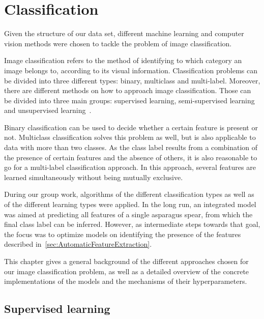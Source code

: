 %
\section{Classification}
\label{ch:Classification}

Given the structure of our data set, different machine learning and computer vision methods were chosen to tackle the problem of image classification.

\bigskip
Image classification refers to the method of identifying to which category an image belongs to, according to its visual information. Classification problems can be divided into three different types: binary, multiclass and multi-label. Moreover, there are different methods on how to approach image classification. Those can be divided into three main groups: supervised learning, semi-supervised learning and unsupervised learning~\citep{har2003constraint}.

Binary classification can be used to decide whether a certain feature is present or not. Multiclass classification solves this problem as well, but is also applicable to data with more than two classes. As the class label results from a combination of the presence of certain features and the absence of others, it is also reasonable to go for a multi-label classification approach. In this approach, several features are learned simultaneously without being mutually exclusive.

During our group work, algorithms of the different classification types as well as of the different learning types were applied.
In the long run, an integrated model was aimed at predicting all features of a single asparagus spear, from which the final class label can be inferred. However, as intermediate steps towards that goal, the focus was to optimize models on identifying the presence of the features described in~\autoref{sec:AutomaticFeatureExtraction}.

\bigskip
This chapter gives a general background of the different approaches chosen for our image classification problem, as well as a detailed overview of the concrete implementations of the models and the mechanisms of their hyperparameters.


\subsection{Supervised learning}
\label{sec:SupervisedLearning}

